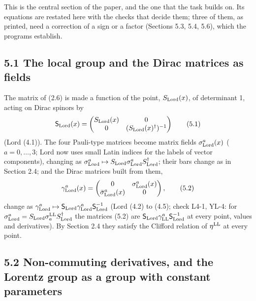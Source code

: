 \documentclass[
  10pt,
]{article}
\begin{document}
This is the central section of the paper, and the one that the task
builds on. Its equations are restated here with the checks that decide
them; three of them, as printed, need a correction of a sign or a factor
(Sections 5.3, 5.4, 5.6), which the programs establish.

\hypertarget{the-local-group-and-the-dirac-matrices-as-fields}{%
\subsection{5.1 The local group and the Dirac matrices as
fields}\label{the-local-group-and-the-dirac-matrices-as-fields}}

The matrix of (2.6) is made a function of the point,
\(S_{\rm Lord}(x)\), of determinant 1, acting on Dirac spinors by
\[\mathsf S_{\rm Lord}(x)=\begin{pmatrix}S_{\rm Lord}(x)&0\\0&(S_{\rm Lord}(x)^\dagger)^{-1}\end{pmatrix}\tag{5.1}\]
(Lord (4.1)). The four Pauli-type matrices become matrix fields
\(\sigma^a_{\rm Lord}(x)\) (\(a=0,\dots,3\); Lord now uses small Latin
indices for the labels of vector components), changing as
\(\sigma^a_{\rm Lord}\mapsto S_{\rm Lord}\sigma^a_{\rm Lord}S^\dagger_{\rm Lord}\);
their bars change as in Section 2.4; and the Dirac matrices built from
them,
\[\gamma^a_{\rm Lord}(x)=\begin{pmatrix}0&\sigma^a_{\rm Lord}(x)\\\bar\sigma^a_{\rm Lord}(x)&0\end{pmatrix},\tag{5.2}\]
change as
\(\gamma^a_{\rm Lord}\mapsto\mathsf S_{\rm Lord}\gamma^a_{\rm Lord}\mathsf S_{\rm Lord}^{-1}\)
(Lord (4.2) to (4.5); check L4-1, YL-4: for
\(\sigma^a_{\rm Lord}=S_{\rm Lord}\sigma^{\rm LL}_aS_{\rm Lord}^\dagger\)
the matrices (5.2) are
\(\mathsf S_{\rm Lord}\gamma^a_{\rm LL}\mathsf S_{\rm Lord}^{-1}\) at
every point, values and derivatives). By Section 2.4 they satisfy the
Clifford relation of \(\eta^{\rm LL}\) at every point.

\hypertarget{non-commuting-derivatives-and-the-lorentz-group-as-a-group-with-constant-parameters}{%
\subsection{5.2 Non-commuting derivatives, and the Lorentz group as a
group with constant
parameters}\label{non-commuting-derivatives-and-the-lorentz-group-as-a-group-with-constant-parameters}}
\end{document}
